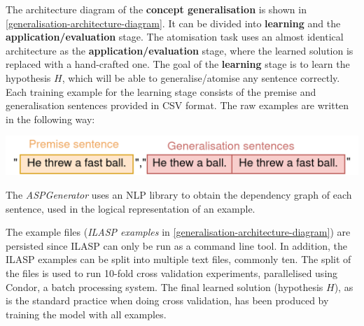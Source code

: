 The architecture diagram of the \textbf{concept generalisation} is shown in \ref{generalisation-architecture-diagram}.
It can be divided into \textbf{learning} and the \textbf{application/evaluation} stage.
The atomisation task uses an almost identical architecture as the \textbf{application/evaluation} stage, where the learned solution is replaced with a hand-crafted one. 
The goal of the \textbf{learning} stage is to learn the hypothesis $H$, which will be able to generalise/atomise any sentence correctly.
Each training example for the learning stage consists of the premise and generalisation sentences provided in CSV format.
The raw examples are written in the following way:


\begin{center}
\setlength\parskip{0pt}
\includegraphics[width=.8\linewidth]{solving-nlp-tasks-logically/raw-generalisation-example.png}
\end{center}

The \textit{ASPGenerator} uses an NLP library to obtain the dependency graph of each sentence, used in the logical representation of an example.

The example files (\textit{ILASP examples} in \ref{generalisation-architecture-diagram}) are persisted since ILASP can only be run as a command line tool.
In addition, the ILASP examples can be split into multiple text files, commonly ten. 
The split of the files is used to run 10-fold cross validation experiments, parallelised using Condor, a batch processing system.
The final learned solution (hypothesis $H$), as is the standard practice when doing cross validation, has been produced by training the model with all examples.

